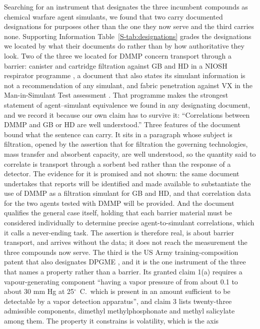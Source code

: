 \documentclass[journal=ancham,manuscript=article,margin=1in]{achemso}
\begin{document}
Searching for an instrument that designates the three incumbent compounds as
chemical warfare agent simulants, we found that two carry documented
designations for purposes other than the one they now serve and the third
carries none. Supporting Information Table~\ref{S-tab:designations} grades the
designations we located by what their documents do rather than by how
authoritative they look. Two of the three
we located for DMMP concern transport through a barrier: canister and cartridge
filtration against GB and HD in a NIOSH respirator programme
\cite{niosh2002simulant}, a document that also states its simulant information
is not a recommendation of any simulant, and fabric penetration against VX in
the Man-in-Simulant Test assessment \cite{nrc1997mist}. That programme makes
the strongest statement of agent--simulant equivalence we found in any
designating document, and we record it because our own claim has to survive it:
``Correlations between DMMP and GB or HD are well understood.'' Three features
of the document bound what the sentence can carry. It sits in a paragraph whose
subject is filtration, opened by the assertion that for filtration the governing
technologies, mass transfer and absorbent capacity, are well understood, so the
quantity said to correlate is transport through a sorbent bed rather than the
response of a detector. The evidence for it is promised and not shown: the same
document undertakes that reports will be identified and made available to
substantiate the use of DMMP as a filtration simulant for GB and HD, and that
correlation data for the two agents tested with DMMP will be provided. And the
document qualifies the general case itself, holding that each barrier material
must be considered individually to determine precise agent-to-simulant
correlations, which it calls a never-ending task. The assertion is therefore
real, is about barrier transport, and arrives without the data; it does not
reach the measurement the three compounds now serve. The third is the US
Army training-composition patent that also designates DPGME
\cite{seitzinger2006simulant}, and it is the one instrument of the three that
names a property rather than a barrier. Its granted claim 1(a) requires a
vapour-generating component ``having a vapor pressure of from about 0.1 to
about 30 mm Hg at 25$^{\circ}$~C.\ which is present in an amount sufficient to
be detectable by a vapor detection apparatus'', and claim 3 lists twenty-three
admissible components, dimethyl methylphosphonate and methyl salicylate among
them. The property it constrains is volatility, which is the axis
\end{document}

